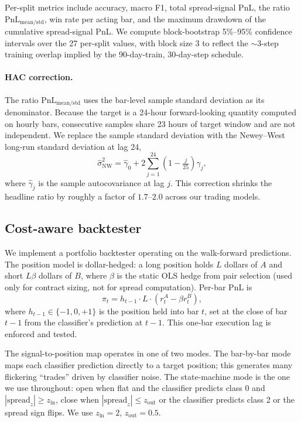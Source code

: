 \documentclass[11pt]{article}
\begin{document}
Per-split metrics include accuracy, macro F1, total spread-signal PnL,
the ratio $\text{PnL}_{\text{mean/std}}$, win rate per acting bar, and
the maximum drawdown of the cumulative spread-signal PnL. We compute
block-bootstrap 5\%--95\% confidence intervals over the 27 per-split
values, with block size 3 to reflect the $\sim$3-step training overlap
implied by the 90-day-train, 30-day-step schedule.

\paragraph{HAC correction.} The ratio
$\text{PnL}_{\text{mean/std}}$ uses the bar-level sample standard
deviation as its denominator. Because the target is a 24-hour
forward-looking quantity computed on hourly bars, consecutive samples
share 23 hours of target window and are not independent. We replace the
sample standard deviation with the Newey--West long-run standard
deviation \citep{newey1987hac} at lag 24,
\begin{equation}
    \widehat{\sigma}^2_{\text{NW}} = \widehat{\gamma}_0
        + 2 \sum_{j=1}^{24} \left(1 - \tfrac{j}{25}\right) \widehat{\gamma}_j,
\end{equation}
where $\widehat{\gamma}_j$ is the sample autocovariance at lag $j$.
This correction shrinks the headline ratio by roughly a factor of
$1.7$--$2.0$ across our trading models.

\subsection{Cost-aware backtester}

We implement a portfolio backtester operating on the walk-forward
predictions. The position model is dollar-hedged: a long position
holds $L$ dollars of $A$ and short $L \beta$ dollars of $B$, where
$\beta$ is the static OLS hedge from pair selection (used only for
contract sizing, not for spread computation). Per-bar PnL is
\begin{equation}
    \pi_t = h_{t-1} \cdot L \cdot (r^A_t - \beta r^B_t),
\end{equation}
where $h_{t-1} \in \{-1, 0, +1\}$ is the position held into bar $t$,
set at the close of bar $t-1$ from the classifier's prediction at
$t-1$. This one-bar execution lag is enforced and tested.

The signal-to-position map operates in one of two modes. The
bar-by-bar mode maps each classifier prediction directly to a target
position; this generates many flickering ``trades'' driven by
classifier noise. The state-machine mode is the one we use throughout:
open when flat and the classifier predicts class 0 and
$|\text{spread}_z| \geq z_{\text{in}}$, close when
$|\text{spread}_z| \leq z_{\text{out}}$ or the classifier predicts
class 2 or the spread sign flips. We use $z_{\text{in}} = 2$,
$z_{\text{out}} = 0.5$.
\end{document}
